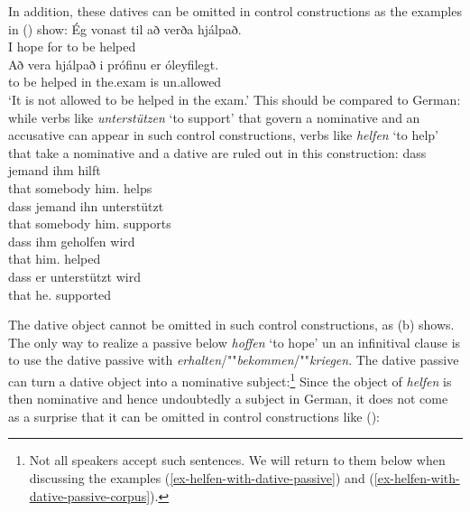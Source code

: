 In addition, these datives can be omitted in control constructions as the examples in () show:
\eal
\ex
\gll Ég vonast til að verða hjálpað.\\
     I  hope   for to be helped\\\icelandic
\ex
\gll Að vera hjálpað i prófinu er óleyfilegt.\\
     to be helped in the.exam is un.allowed\\
\glt `It is not allowed to be helped in the exam.'
\zl
This should be compared to German: while verbs like \emph{unterstützen} `to support' that govern a
nominative and an accusative can appear in such control constructions, verbs like \emph{helfen} `to
help' that take a nominative and a dative are ruled out in this construction:
\eal
\ex 
\gll dass jemand ihm hilft\\
     that somebody him.\DAT{} helps\\\german
\ex
\gll dass jemand ihn unterstützt\\
     that somebody him.\ACC{} supports\\
\ex
\gll  dass ihm geholfen wird\\
      that him.\DAT{} helped \AUX\\
\ex
\gll  dass er unterstützt wird\\
      that he.\NOM{} supported \AUX\\
\zl

\eal
{}
\zl
The dative object cannot be omitted in such control constructions, as (b) shows. The only way
to realize a passive below \emph{hoffen} `to hope' un an infinitival clause is to use the dative passive with
\emph{erhalten}/""\emph{bekommen}/""\emph{kriegen}. The dative passive can turn a dative object into a
nominative subject:\footnote{
  Not all speakers accept such sentences. We will return to them below when discussing the examples
  (\ref{ex-helfen-with-dative-passive}) and (\ref{ex-helfen-with-dative-passive-corpus}).
}
\z
Since the object of \emph{helfen} is then nominative and hence undoubtedly a subject in German, it
does not come as a surprise that it can be omitted in control constructions like ():
\z



